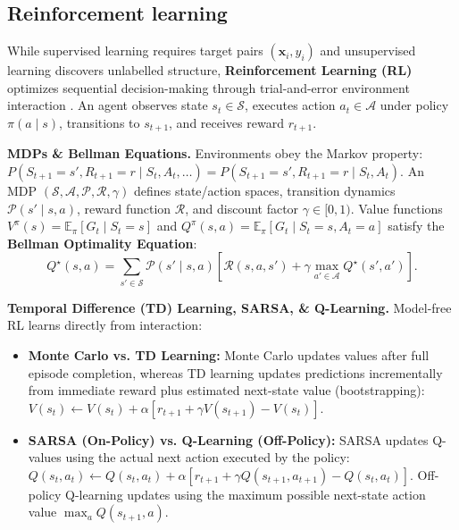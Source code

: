 \documentclass[11pt,a4paper]{article}
\begin{document}
	\subsection{Reinforcement learning}
	
	While supervised learning requires target pairs $(\mathbf{x}_i, y_i)$ and unsupervised learning discovers unlabelled structure, \textbf{Reinforcement Learning (RL)} optimizes sequential decision-making through trial-and-error environment interaction \parencite{sutton2018}. An agent observes state $s_t \in \mathcal{S}$, executes action $a_t \in \mathcal{A}$ under policy $\pi(a \mid s)$, transitions to $s_{t+1}$, and receives reward $r_{t+1}$.
	
	\textbf{MDPs \& Bellman Equations.} Environments obey the Markov property: $P(S_{t+1}=s', R_{t+1}=r \mid S_t, A_t, \dots) = P(S_{t+1}=s', R_{t+1}=r \mid S_t, A_t)$. An MDP $(\mathcal{S}, \mathcal{A}, \mathcal{P}, \mathcal{R}, \gamma)$ defines state/action spaces, transition dynamics $\mathcal{P}(s' \mid s, a)$, reward function $\mathcal{R}$, and discount factor $\gamma \in [0, 1)$. Value functions $V^\pi(s) = \mathbb{E}_\pi[G_t \mid S_t=s]$ and $Q^\pi(s, a) = \mathbb{E}_\pi[G_t \mid S_t=s, A_t=a]$ satisfy the \textbf{Bellman Optimality Equation}:
	\begin{equation}
		Q^{\star}(s, a) = \sum_{s' \in \mathcal{S}} \mathcal{P}(s' \mid s, a) \left[ \mathcal{R}(s, a, s') + \gamma \max_{a' \in \mathcal{A}} Q^{\star}(s', a') \right].
	\end{equation}

	\textbf{Temporal Difference (TD) Learning, SARSA, \& Q-Learning.} Model-free RL learns directly from interaction:
	\begin{itemize}[nosep]
		\item \textbf{Monte Carlo vs. TD Learning:} Monte Carlo updates values after full episode completion, whereas TD learning updates predictions incrementally from immediate reward plus estimated next-state value (bootstrapping): $V(s_t) \leftarrow V(s_t) + \alpha [r_{t+1} + \gamma V(s_{t+1}) - V(s_t)]$.
		\item \textbf{SARSA (On-Policy) vs. Q-Learning (Off-Policy):} SARSA updates Q-values using the actual next action executed by the policy: $Q(s_t,a_t) \leftarrow Q(s_t,a_t) + \alpha [r_{t+1} + \gamma Q(s_{t+1}, a_{t+1}) - Q(s_t,a_t)]$. Off-policy Q-learning \parencite{watkins1992} updates using the maximum possible next-state action value $\max_a Q(s_{t+1}, a)$.
	\end{itemize}
\end{document}
